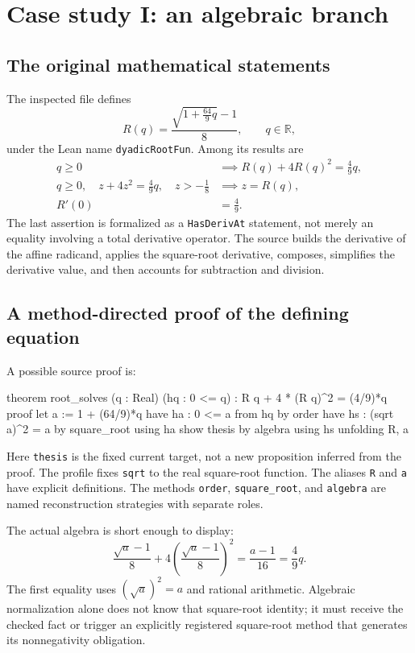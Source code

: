 \documentclass[11pt,a4paper]{article}
\theoremstyle{remark}
\newcommand{\ty}[1]{\texttt{#1}}
\newcommand{\R}{\mathbb{R}}
\begin{document}
\section{Case study I: an algebraic branch}\label{sec:root}

\subsection{The original mathematical statements}
The inspected file defines
\begin{equation}\label{eq:rootdef}
 R(q)=\frac{\sqrt{1+\frac{64}{9}q}-1}{8},\qquad q\in\R,
\end{equation}
under the Lean name \ty{dyadicRootFun}. Among its results are
\begin{align}
 q\geq0&\implies R(q)+4R(q)^2=\frac49q,\label{eq:rootsolves}\\
 q\geq0,\quad z+4z^2=\frac49q,\quad z> -\frac18
 &\implies z=R(q),\label{eq:rootunique}\\
 R'(0)&=\frac49.\label{eq:rootderiv}
\end{align}
The last assertion is formalized as a \ty{HasDerivAt} statement, not merely an equality involving a total derivative operator. The source builds the derivative of the affine radicand, applies the square-root derivative, composes, simplifies the derivative value, and then accounts for subtraction and division.\cite{proveit-root}

\subsection{A method-directed proof of the defining equation}
A possible source proof is:
\Needspace{106pt}
\begin{code}
theorem root_solves (q : Real) (hq : 0 <= q) :
  R q + 4 * (R q)^2 = (4/9)*q
proof
  let a := 1 + (64/9)*q
  have ha : 0 <= a from hq by order
  have hs : (sqrt a)^2 = a by square_root using ha
  show thesis by algebra using hs unfolding R, a
\end{code}
Here \ty{thesis} is the fixed current target, not a new proposition inferred from the proof. The profile fixes \ty{sqrt} to the real square-root function. The aliases \ty{R} and \ty{a} have explicit definitions. The methods \ty{order}, \ty{square\_root}, and \ty{algebra} are named reconstruction strategies with separate roles.

The actual algebra is short enough to display:
\[
\frac{\sqrt a-1}{8}+4\left(\frac{\sqrt a-1}{8}\right)^2
 =\frac{a-1}{16}
 =\frac49q.
\]
The first equality uses $(\sqrt a)^2=a$ and rational arithmetic. Algebraic normalization alone does not know that square-root identity; it must receive the checked fact or trigger an explicitly registered square-root method that generates its nonnegativity obligation.
\end{document}
